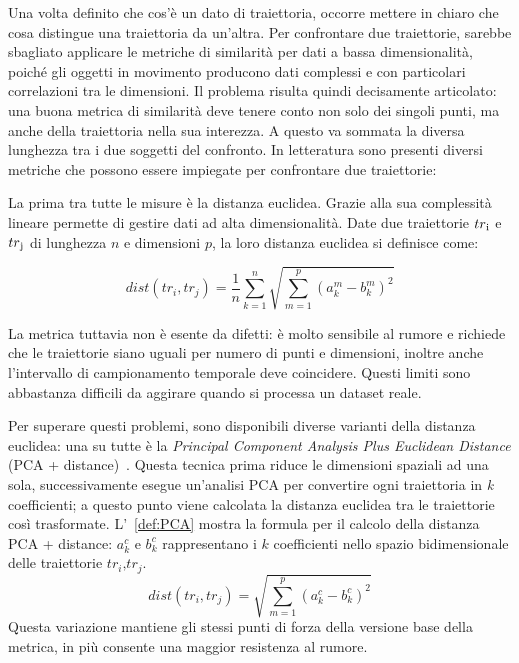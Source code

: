 Una volta definito che cos'è un dato di traiettoria, occorre mettere in chiaro che cosa distingue una traiettoria da un'altra.
Per confrontare due traiettorie, sarebbe sbagliato applicare le metriche di similarità per dati a bassa dimensionalità,
poiché gli oggetti in movimento producono dati complessi e con particolari correlazioni tra le dimensioni.
Il problema risulta quindi decisamente articolato: una buona metrica di similarità deve tenere conto non solo dei singoli punti, ma anche della
traiettoria nella sua interezza.
A questo va sommata la diversa lunghezza tra i due soggetti del confronto.
In letteratura sono presenti diversi metriche che possono essere impiegate per confrontare due traiettorie:

  La prima tra tutte le misure è la distanza euclidea. Grazie alla sua complessità lineare permette di gestire dati ad alta dimensionalità.
  Date due traiettorie  \(tr\textsubscript{i}\) e  \(tr\textsubscript{j}\) di lunghezza \(n\) e dimensioni \(p\), la loro distanza euclidea si definisce come:

  \begin{equation}
    {dist(tr_{i}, tr_{j}) = { {\frac{1}{n} } \sum_{k=1}^{n} {\sqrt{\sum_{m=1}^{p}{(a_{k}^{m} - b_{k}^{m})}^2}}}}
  \end{equation}

  La metrica tuttavia non è esente da difetti: è molto sensibile al rumore e richiede che le traiettorie siano uguali per numero di punti
  e dimensioni, inoltre anche l'intervallo di campionamento temporale deve coincidere.
  Questi limiti sono abbastanza difficili da aggirare quando si processa un dataset reale.

  Per superare questi problemi, sono disponibili diverse varianti della distanza euclidea: una su tutte è la \textit{Principal Component Analysis Plus Euclidean Distance} (PCA + distance)~\cite{zhang2006comparison}.
  Questa tecnica prima riduce le dimensioni spaziali ad una sola, successivamente esegue un'analisi PCA per convertire ogni traiettoria in
  \textit{k} coefficienti; a questo punto viene calcolata la distanza euclidea tra le traiettorie così trasformate.
  L'~\cref{def:PCA} mostra la formula per il calcolo della distanza PCA + distance: \(a_{k}^{c}\) e \(b_{k}^{c}\) rappresentano i
  \(k\) coefficienti nello spazio bidimensionale delle traiettorie \(tr_{i}\text{,}tr_{j}\). 
  \begin{equation} \label{def:PCA}
    {dist(tr_{i}, tr_{j}) = {\sqrt{\sum_{m=1}^{p}{(a_{k}^{c} - b_{k}^{c})}^2}}}
  \end{equation}
  Questa variazione mantiene gli stessi punti di forza della versione base della metrica, in più consente una maggior resistenza al rumore.

